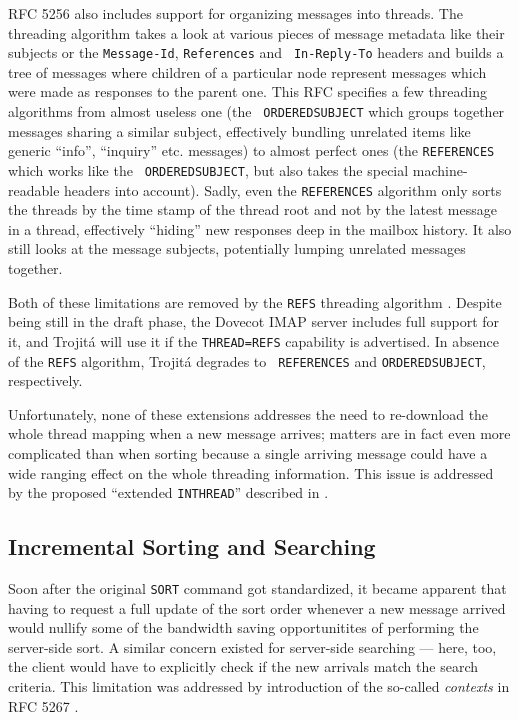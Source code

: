 \documentclass[trojita]{subfiles}
\begin{document}
RFC 5256 \cite{rfc5256} also includes support for organizing messages into threads.  The threading algorithm takes a
look at various pieces of message metadata like their subjects or the {\tt Message-Id}, {\tt References} and {\tt
In-Reply-To} headers and builds a tree of messages where children of a particular node represent messages which were
made as responses to the parent one.  This RFC specifies a few threading algorithms from almost useless one (the {\tt
ORDEREDSUBJECT} which groups together messages sharing a similar subject, effectively bundling unrelated items like
generic ``info'', ``inquiry'' etc. messages) to almost perfect ones (the {\tt REFERENCES} which works like the {\tt
ORDEREDSUBJECT}, but also takes the special machine-readable headers into account).  Sadly, even the {\tt REFERENCES}
algorithm only sorts the threads by the time stamp of the thread root and not by the latest message in a thread,
effectively ``hiding'' new responses deep in the mailbox history.  It also still looks at the message subjects,
potentially lumping unrelated messages together.

Both of these limitations are removed by the {\tt REFS} threading algorithm \cite{draft-ietf-morg-inthread}.  Despite
being still in the draft phase, the Dovecot IMAP server includes full support for it, and Trojitá will use it if the
{\tt THREAD=REFS} capability is advertised.  In absence of the {\tt REFS} algorithm, Trojitá degrades to {\tt
REFERENCES} and {\tt ORDEREDSUBJECT}, respectively.

Unfortunately, none of these extensions addresses the need to re-download the whole thread mapping when a new message
arrives; matters are in fact even more complicated than when sorting because a single arriving message could have a wide
ranging effect on the whole threading information.  This issue is addressed by the proposed ``extended {\tt INTHREAD}''
described in .

\subsection{Incremental Sorting and Searching}

Soon after the original {\tt SORT} command got standardized, it became apparent that having to request a full update of
the sort order whenever a new message arrived would nullify some of the bandwidth saving opportunitites of performing
the server-side sort.  A similar concern existed for server-side searching --- here, too, the client would have to
explicitly check if the new arrivals match the search criteria.  This limitation was addressed by introduction of the
so-called {\em contexts} in RFC 5267 \cite{rfc5267}.
\end{document}
